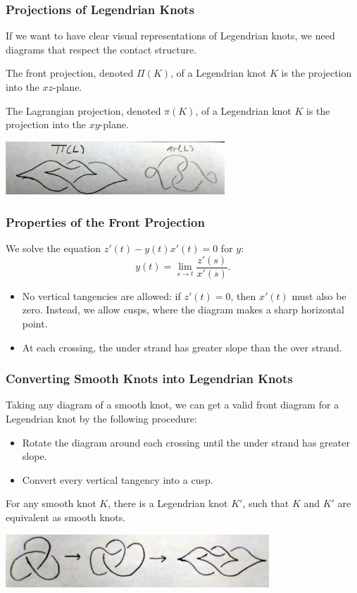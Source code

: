 \documentclass{beamer}
\begin{document}
\begin{frame}
    \frametitle{Projections of Legendrian Knots}
    If we want to have clear visual representations of Legendrian knots,
    we need diagrams that respect the contact structure.

    \begin{definition}
    The \alert{front projection}, denoted \alert{$\Pi(K)$}, of a Legendrian knot $K$ is the projection
    into the $xz$-plane.
    \end{definition}

    \begin{definition}
    The \alert{Lagrangian projection}, denoted \alert{$\pi(K)$}, of a Legendrian knot $K$ is the projection
    into the $xy$-plane.
    \end{definition}
    \includegraphics[height=2cm]{piPi.jpg}
\end{frame}

\begin{frame}
    \frametitle{Properties of the Front Projection}
    We solve the equation $z'(t) - y(t)x'(t) = 0$ for $y$:
    \[ y(t) = \lim_{s\to t} \frac{z'(s)}{x'(s)}. \]

    \begin{itemize}
    \item No vertical tangencies are allowed: if $z'(t) = 0$, then $x'(t)$ must also be zero.
    Instead, we allow \alert{cusps}, where the diagram makes a sharp horizontal point.
    \item At each crossing, the under strand has greater slope than the over strand.
    \end{itemize}
\end{frame}

\begin{frame}
    \frametitle{Converting Smooth Knots into Legendrian Knots}
    Taking any diagram of a smooth knot, we can get a valid front diagram for a Legendrian
    knot by the following procedure:
    \begin{itemize}
    \item Rotate the diagram around each crossing until the under strand has greater slope.
    \item Convert every vertical tangency into a cusp.
    \end{itemize}
    \begin{theorem}
        For any smooth knot $K$, there is a Legendrian knot $K'$, such that $K$ and $K'$ are
        equivalent as smooth knots.
    \end{theorem}
    \includegraphics[height=2cm]{smoothToLegendrian.jpg}
\end{frame}
\end{document}
